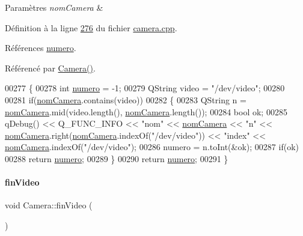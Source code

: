 \begin{DoxyParams}{Paramètres}
{\em nom\+Camera} & \\
\hline
\end{DoxyParams}


Définition à la ligne \hyperlink{camera_8cpp_source_l00276}{276} du fichier \hyperlink{camera_8cpp_source}{camera.\+cpp}.



Références \hyperlink{camera_8h_source_l00064}{numero}.



Référencé par \hyperlink{camera_8cpp_source_l00034}{Camera()}.


\begin{DoxyCode}
00277 \{
00278     \textcolor{keywordtype}{int} \hyperlink{class_camera_ae5cda5df3c9c49b88fff15389a1bbc64}{numero} = -1;
00279     QString video = \textcolor{stringliteral}{"/dev/video"};
00280 
00281     \textcolor{keywordflow}{if}(\hyperlink{class_camera_ac1cdaf82921d2a2f3f941d867718eba2}{nomCamera}.contains(video))
00282     \{
00283         QString n = \hyperlink{class_camera_ac1cdaf82921d2a2f3f941d867718eba2}{nomCamera}.mid(video.length(), \hyperlink{class_camera_ac1cdaf82921d2a2f3f941d867718eba2}{nomCamera}.length());
00284         \textcolor{keywordtype}{bool} ok;
00285         qDebug() << Q\_FUNC\_INFO << \textcolor{stringliteral}{"nom"} << \hyperlink{class_camera_ac1cdaf82921d2a2f3f941d867718eba2}{nomCamera} << \textcolor{stringliteral}{"n"} << 
      \hyperlink{class_camera_ac1cdaf82921d2a2f3f941d867718eba2}{nomCamera}.right(\hyperlink{class_camera_ac1cdaf82921d2a2f3f941d867718eba2}{nomCamera}.indexOf(\textcolor{stringliteral}{"/dev/video"})) << \textcolor{stringliteral}{"index"} << 
      \hyperlink{class_camera_ac1cdaf82921d2a2f3f941d867718eba2}{nomCamera}.indexOf(\textcolor{stringliteral}{"/dev/video"});
00286         numero = n.toInt(&ok);
00287         \textcolor{keywordflow}{if}(ok)
00288             \textcolor{keywordflow}{return} \hyperlink{class_camera_ae5cda5df3c9c49b88fff15389a1bbc64}{numero};
00289     \}
00290     \textcolor{keywordflow}{return} \hyperlink{class_camera_ae5cda5df3c9c49b88fff15389a1bbc64}{numero};
00291 \}
\end{DoxyCode}
\mbox{\label{class_camera_a4c560c4add60ebce65e2d9717e3d668c}} 
\paragraph{\texorpdfstring{fin\+Video}{finVideo}}
{\footnotesize\ttfamily void Camera\+::fin\+Video (\begin{DoxyParamCaption}{ }\end{DoxyParamCaption})\hspace{0.3cm}{\ttfamily [signal]}}



